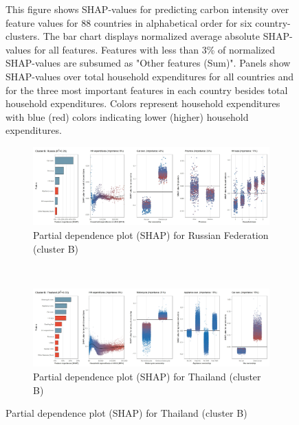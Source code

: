 \begin{figure}[ht!]
    \begin{subcaption2}
     This figure shows SHAP-values for predicting carbon intensity over feature values for 88 countries in alphabetical order for six country-clusters. The bar chart displays normalized average absolute SHAP-values for all features. Features with less than 3\% of normalized SHAP-values are subsumed as "Other features (Sum)". Panels show SHAP-values over total household expenditures for all countries and for the three most important features in each country besides total household expenditures. Colors represent household expenditures with blue (red) colors indicating lower (higher) household expenditures.
     \end{subcaption2}
\end{figure}

\begin{figure}[ht!]\ContinuedFloat
    \centering
   \begin{subfigure}[b]{\textwidth}
   \centering
         \caption{Partial dependence plot (SHAP) for Russian Federation (cluster B)}
         \label{fig:5b_RUS}
         \includegraphics[width=\textwidth]{Figure 5b/Figure_5b_RUS}
         \end{subfigure}
    \\
    \vspace{0.5cm}
    \begin{subfigure}[b]{\textwidth}
    \centering
         \caption{Partial dependence plot (SHAP) for Thailand (cluster B)}
         \label{fig:5b_THA}
         \includegraphics[width=\textwidth]{Figure 5b/Figure_5b_THA}
         \end{subfigure}

\end{figure}
